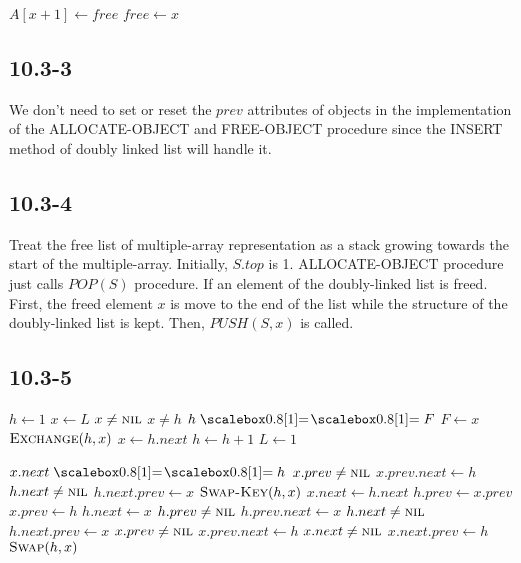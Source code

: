 \documentclass{book}
\begin{document}
\begin{CJK}{UTF8}{gkai}
\begin{codebox}
\li $A[x+1] \gets free$
\li $free \gets x$
\end{codebox}



\subsection*{10.3-3}
We don't need to set or reset the $prev$ attributes of objects in the 
implementation of the ALLOCATE-OBJECT and FREE-OBJECT procedure since the INSERT 
method of doubly linked list will handle it.

\subsection*{10.3-4}
Treat the free list of multiple-array representation as a stack growing towards 
the start of the multiple-array.  Initially, $S.top$ is 1.  ALLOCATE-OBJECT 
procedure just calls $POP(S)$ procedure. If an element of the doubly-linked list 
is freed.  First, the freed element $x$ is move to the end of the list while the 
structure of the doubly-linked list is kept.  Then, $PUSH(S, x)$ is called.

\subsection*{10.3-5}

\begin{codebox}
\li $h \gets 1$
\li $x \gets L$
\li \While $x \ne \textnormal{\scshape nil}$
\li \Do \If $x \ne h$
\li \Then \If $h \isequal F$
\li \Then $F \gets x$
\End
\li $\textnormal{\scshape Exchange}(h, x)$
\End
\li $x \gets h.next$
\li $h \gets h + 1$
\End
\li $L \gets 1$
\end{codebox}

\begin{codebox}
\li \If $x.next \isequal h$
\li \Then \If $x.prev \ne \textnormal{\scshape nil}$
\li \Then $x.prev.next \gets h$
\End
\li \If $h.next \ne \textnormal{\scshape nil}$
\li \Then $h.next.prev \gets x$
\End
\li $\textnormal{\scshape Swap-Key}(h, x)$
\li $x.next \gets h.next$
\li $h.prev \gets x.prev$
\li $x.prev \gets h$
\li $h.next \gets x$
\li \Else \li \If $h.prev \ne \textnormal{\scshape nil}$
\li \Then $h.prev.next \gets x$
\End
\li \If $h.next \ne \textnormal{\scshape nil}$
\li \Then $h.next.prev \gets x$
\End
\li \If $x.prev \ne \textnormal{\scshape nil}$
\li \Then $x.prev.next \gets h$
\End
\li \If $x.next \ne \textnormal{\scshape nil}$
\li \Then $x.next.prev \gets h$
\End
\li $\textnormal{\scshape Swap}(h,x)$
\End
\end{codebox}


\end{CJK}
\end{document}
